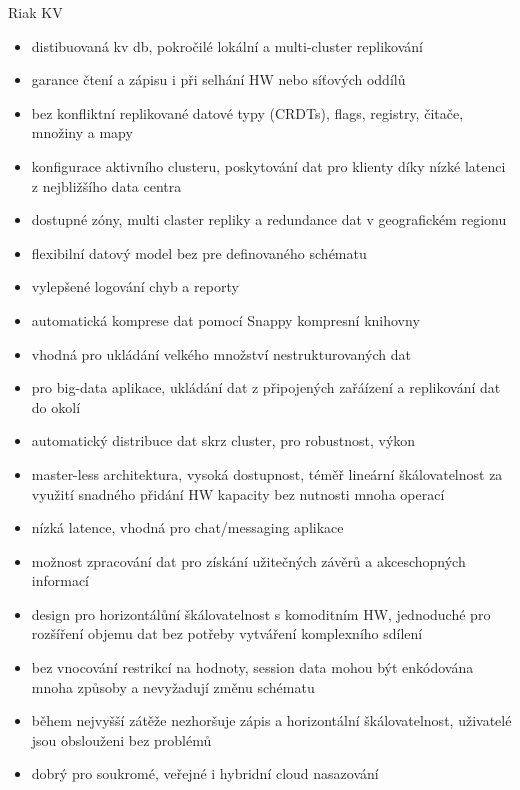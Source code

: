 \documentclass{article}
\begin{document}
	\begin{subsubsection}{Riak KV}
		\begin{itemize}
			\item distibuovaná kv db, pokročilé lokální a multi-cluster replikování
			\item garance čtení a zápisu i při selhání HW nebo síťových oddílů
			\item bez konfliktní replikované datové typy (CRDTs), flags, registry, čitače, množiny a mapy
			\item konfigurace aktivního clusteru, poskytování dat pro klienty díky nízké latenci z nejbližšího data centra
			\item dostupné zóny, multi claster repliky a redundance dat v geografickém regionu
			\item flexibilní datový model bez pre definovaného schématu
			\item vylepšené logování chyb a reporty
			\item automatická komprese dat pomocí Snappy kompresní knihovny
			\item vhodná pro ukládání velkého množství nestrukturovaných dat
			\item pro big-data aplikace, ukládání dat z připojených zařáízení a replikování dat do okolí
			\item automatický distribuce dat skrz cluster, pro robustnost, výkon
			\item master-less architektura, vysoká dostupnost, téměř lineární škálovatelnost za využití snadného přidání HW kapacity bez nutnosti mnoha operací
			\item nízká latence, vhodná pro chat/messaging aplikace
			\item možnost zpracování dat pro získání užitečných závěrů a akceschopných informací
			\item design pro horizontálůní škálovatelnost s komoditním HW, jednoduché pro rozšíření objemu dat bez potřeby vytváření komplexního sdílení
			\item bez vnocování restrikcí na hodnoty, session data mohou být enkódována mnoha způsoby a nevyžadují změnu schématu
			\item během nejvyšší zátěže nezhoršuje zápis a horizontální škálovatelnost, uživatelé jsou obslouženi bez problémů
			\item dobrý pro soukromé, veřejné i hybridní cloud nasazování
		\end{itemize}
	\end{subsubsection}
\end{document}

